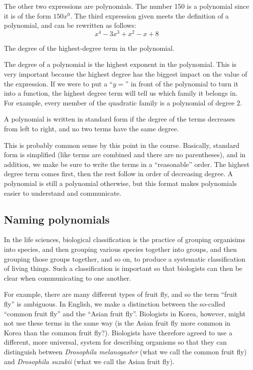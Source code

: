 The other two expressions are polynomials. The number 150 is a polynomial since it is of the form $150x^0$. The third expression given meets the definition of a polynomial, and can be rewritten as follows:
\[x^4 - 3x^3 + x^2 - x + 8\]

\begin{boxdef}
The degree of the highest-degree term in the polynomial.
\end{boxdef}

The degree of a polynomial is the highest exponent in the polynomial. This is very important because the highest degree has the biggest impact on the value of the expression. If we were to put a ``$y=$'' in front of the polynomial to turn it into a function, the highest degree term will tell us which family it belongs in. For example, every member of the quadratic family is a polynomial of degree 2.

\begin{boxdef}
A polynomial is written in standard form if the degree of the terms decreases from left to right, and no two terms have the same degree.
\end{boxdef} 

This is probably common sense by this point in the course. Basically, standard form is simplified (like terms are combined and there are no parentheses), and in addition, we make be sure to write the terms in a ``reasonable'' order. The highest degree term comes first, then the rest follow in order of decreasing degree. A polynomial is still a polynomial otherwise, but this format makes polynomials easier to understand and communicate.


\subsection{Naming polynomials}

In the life sciences, biological classification is the practice of grouping organisims into species, and then grouping various species together into groups, and then grouping those groups together, and so on, to produce a systematic classification of living things. Such a classification is important so that biologists can then be clear when communicating to one another.

For example, there are many different types of fruit fly, and so the term ``fruit fly'' is ambiguous. In English, we make a distinction between the so-called ``common fruit fly'' and the ``Asian fruit fly''. Biologists in Korea, however, might not use these terms in the same way (is the Asian fruit fly more common in Korea than the common fruit fly?). Biologists have therefore agreed to use a different, more universal, system for describing organisms so that they can distinguish between \textit{Drosophila melanogaster} (what we call the common fruit fly) and \textit{Drosophila suzukii} (what we call the Asian fruit fly).

